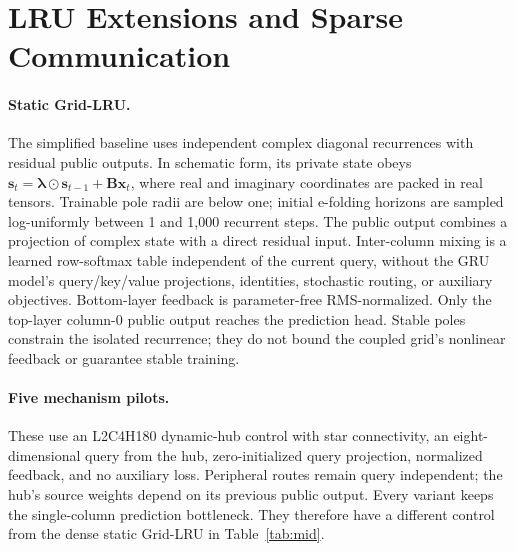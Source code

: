 \documentclass[letterpaper,twoside]{article}
\begin{document}
\section{LRU Extensions and Sparse Communication}\label{app:lru}

\paragraph{Static Grid-LRU.}
The simplified baseline uses independent complex diagonal recurrences with residual public outputs. In schematic form, its private state obeys $\mathbf{s}_t=\boldsymbol{\lambda}\odot\mathbf{s}_{t-1}+\mathbf{B}\mathbf{x}_t$, where real and imaginary coordinates are packed in real tensors. Trainable pole radii are below one; initial e-folding horizons are sampled log-uniformly between 1 and 1,000 recurrent steps. The public output combines a projection of complex state with a direct residual input. Inter-column mixing is a learned row-softmax table independent of the current query, without the GRU model's query/key/value projections, identities, stochastic routing, or auxiliary objectives. Bottom-layer feedback is parameter-free RMS-normalized. Only the top-layer column-0 public output reaches the prediction head. Stable poles constrain the isolated recurrence; they do not bound the coupled grid's nonlinear feedback or guarantee stable training.

\paragraph{Five mechanism pilots.}
These use an L2C4H180 dynamic-hub control with star connectivity, an eight-dimensional query from the hub, zero-initialized query projection, normalized feedback, and no auxiliary loss. Peripheral routes remain query independent; the hub's source weights depend on its previous public output. Every variant keeps the single-column prediction bottleneck. They therefore have a different control from the dense static Grid-LRU in Table~\ref{tab:mid}.
\end{document}
